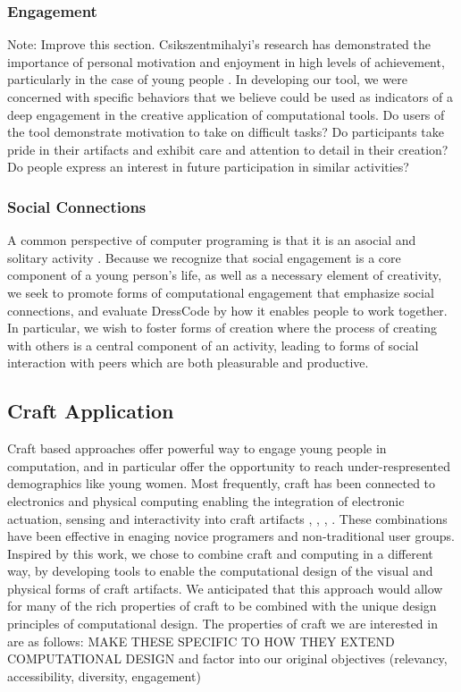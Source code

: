 \documentclass{sigchi}
\begin{document}
\subsubsection{Engagement}
Note: Improve this section. Csikszentmihalyi’s research has demonstrated the importance of personal motivation and enjoyment in high levels of achievement, particularly in the case of young people \cite{csiks}.  In developing our tool, we were concerned with specific behaviors that we believe could be used as indicators of a deep engagement in the creative application of computational tools. Do users of the tool demonstrate motivation to take on difficult tasks? Do participants take pride in their artifacts and exhibit care and attention to detail in their creation? Do people express an interest in future participation in similar activities? 

\subsubsection{Social Connections}
A common perspective of computer programing is that it is an asocial and solitary activity \cite{introductory_programing}. Because we recognize that social engagement is a core component of a young person's life, as well as a necessary element of creativity, we seek to promote forms of computational engagement that emphasize social connections, and evaluate DressCode by how it enables people to work together. In particular, we wish to foster forms of creation where the process of creating with others is a central component of an activity, leading to forms of social interaction with peers which are both pleasurable and productive. 

\subsection{Craft Application}
Craft based approaches offer powerful way to engage young people in computation, and in particular offer the opportunity to reach under-respresented demographics like young women. Most frequently, craft has been connected to electronics and physical computing enabling the integration of electronic actuation, sensing and interactivity into craft artifacts \cite{dave}, \cite{kit_of_no_parts}, \cite{jie}, \cite{leah_lilypad}. These combinations have been effective in enaging novice programers and non-traditional user groups. Inspired by this work, we chose to combine craft and computing in a different way, by developing tools to enable the computational design of the visual and physical forms of craft artifacts. We anticipated that this approach would allow for many of the rich properties of craft to be combined with the unique design principles of computational design. The properties of craft we are interested in are as follows:
MAKE THESE SPECIFIC TO HOW THEY EXTEND COMPUTATIONAL DESIGN and factor into our original objectives (relevancy, accessibility, diversity, engagement)
\end{document}
